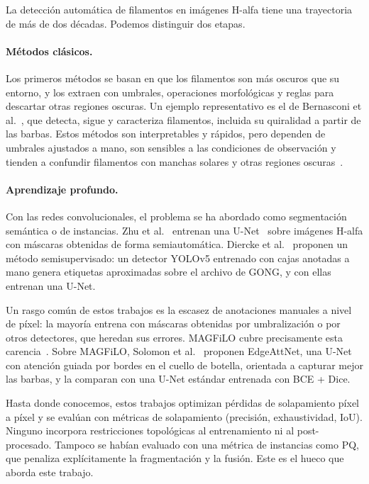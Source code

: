 La detección automática de filamentos en imágenes H-alfa tiene una
trayectoria de más de dos décadas. Podemos distinguir dos etapas.

\paragraph{Métodos clásicos.} Los primeros métodos se basan en que los
filamentos son más oscuros que su entorno, y los extraen con umbrales,
operaciones morfológicas y reglas para descartar otras regiones oscuras.
Un ejemplo representativo es el de Bernasconi et
al.~\cite{bernasconi2005}, que detecta, sigue y caracteriza filamentos,
incluida su quiralidad a partir de las barbas. Estos métodos son
interpretables y rápidos, pero dependen de umbrales ajustados a mano,
son sensibles a las condiciones de observación y tienden a confundir
filamentos con manchas solares y otras regiones
oscuras~\cite{diercke2024}.

\paragraph{Aprendizaje profundo.} Con las redes convolucionales, el
problema se ha abordado como segmentación semántica o de instancias.
Zhu et al.~\cite{zhu2019} entrenan una U-Net~\cite{ronneberger2015} sobre
imágenes H-alfa con máscaras obtenidas de forma semiautomática. Diercke
et al.~\cite{diercke2024} proponen un método semisupervisado: un detector
YOLOv5 entrenado con cajas anotadas a mano genera etiquetas aproximadas
sobre el archivo de GONG, y con ellas entrenan una U-Net.

Un rasgo común de estos trabajos es la escasez de anotaciones manuales a
nivel de píxel: la mayoría entrena con máscaras obtenidas por
umbralización o por otros detectores, que heredan sus errores. MAGFiLO
cubre precisamente esta carencia~\cite{ahmadzadeh2024}. Sobre MAGFiLO,
Solomon et al.~\cite{solomon2025} proponen EdgeAttNet, una U-Net con
atención guiada por bordes en el cuello de botella, orientada a capturar
mejor las barbas, y la comparan con una U-Net estándar entrenada con
BCE + Dice.

Hasta donde conocemos, estos trabajos optimizan pérdidas de solapamiento
píxel a píxel y se evalúan con métricas de solapamiento (precisión,
exhaustividad, IoU). Ninguno incorpora restricciones topológicas al
entrenamiento ni al post-procesado. Tampoco se habían evaluado con una
métrica de instancias como PQ, que penaliza explícitamente la
fragmentación y la fusión. Este es el hueco que aborda este trabajo.

